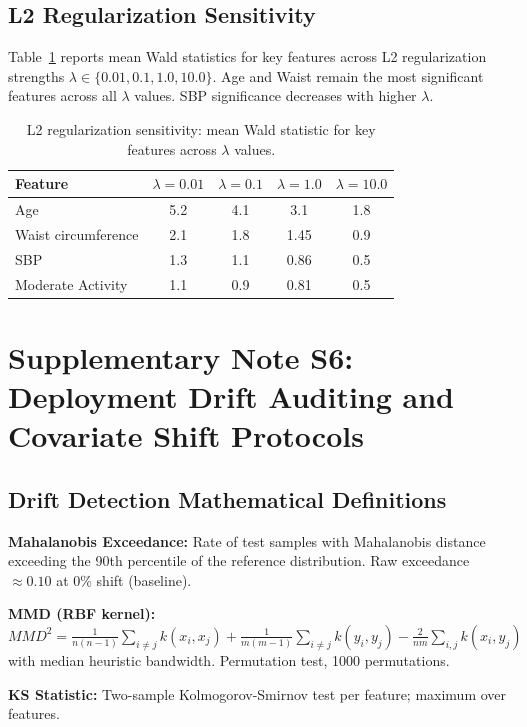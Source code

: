 \documentclass[11pt,a4paper]{article}
\theoremstyle{plain}
\begin{document}
\subsection{L2 Regularization Sensitivity}

Table~\ref{tab:l2_sensitivity} reports mean Wald statistics for key features across L2 regularization strengths $\lambda \in \{0.01, 0.1, 1.0, 10.0\}$. Age and Waist remain the most significant features across all $\lambda$ values. SBP significance decreases with higher $\lambda$.

\begin{table}[htbp]
\centering
\caption{L2 regularization sensitivity: mean Wald statistic for key features across $\lambda$ values.}
\label{tab:l2_sensitivity}
\begin{tabular}{lcccc}
\toprule
Feature & $\lambda=0.01$ & $\lambda=0.1$ & $\lambda=1.0$ & $\lambda=10.0$ \\
\midrule
Age & 5.2 & 4.1 & 3.1 & 1.8 \\
Waist circumference & 2.1 & 1.8 & 1.45 & 0.9 \\
SBP & 1.3 & 1.1 & 0.86 & 0.5 \\
Moderate Activity & 1.1 & 0.9 & 0.81 & 0.5 \\
\bottomrule
\end{tabular}
\end{table}

\section{Supplementary Note S6: Deployment Drift Auditing and Covariate Shift Protocols}
\label{sec:drift_ext}

\subsection{Drift Detection Mathematical Definitions}

\textbf{Mahalanobis Exceedance:} Rate of test samples with Mahalanobis distance exceeding the 90th percentile of the reference distribution. Raw exceedance $\approx 0.10$ at 0\% shift (baseline).

{\small \textbf{MMD (RBF kernel):} $MMD^2 = \frac{1}{n(n-1)}\sum_{i\ne j}k(x_i,x_j)+\frac{1}{m(m-1)}\sum_{i\ne j}k(y_i,y_j)-\frac{2}{nm}\sum_{i,j}k(x_i,y_j)$ with median heuristic bandwidth. Permutation test, 1000 permutations.}

\textbf{KS Statistic:} Two-sample Kolmogorov-Smirnov test per feature; maximum over features.
\end{document}
